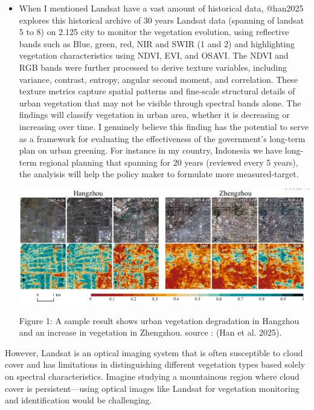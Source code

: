 \documentclass[
  letterpaper,
  DIV=11,
  numbers=noendperiod]{scrreprt}
\begin{document}
\begin{itemize}
\item
  When I mentioned Landsat have a vast amount of historical data,
  @han2025 explores this historical archive of 30 years Landsat data
  (spanning of landsat 5 to 8) on 2.125 city to monitor the vegetation
  evolution, using reflective bands such as Blue, green, red, NIR and
  SWIR (1 and 2) and highlighting vegetation characteristics using NDVI,
  EVI, and OSAVI. The NDVI and RGB bands were further processed to
  derive texture variables, including variance, contrast, entropy,
  angular second moment, and correlation. These texture metrics capture
  spatial patterns and fine-scale structural details of urban vegetation
  that may not be visible through spectral bands alone. The findings
  will classify vegetation in urban area, whether it is decreasing or
  increasing over time. I genuinely believe this finding has the
  potential to serve as a framework for evaluating the effectiveness of
  the government's long-term plan on urban greening. For instance in my
  country, Indonesia we have long-term regional planning that spanning
  for 20 years (reviewed every 5 years), the analyisis will help the
  policy maker to formulate more measured-target.

  \includegraphics[width=6.96875in,height=\textheight]{images/clipboard-1072383063.png}

  Figure 1: A sample result shows urban vegetation degradation in
  Hangzhou and an increase in vegetation in Zhengzhou. source : (Han et
  al. 2025).
\end{itemize}

However, Landsat is an optical imaging system that is often susceptible
to cloud cover and has limitations in distinguishing different
vegetation types based solely on spectral characteristics. Imagine
studying a mountainous region where cloud cover is persistent---using
optical images like Landsat for vegetation monitoring and identification
would be challenging.
\end{document}
